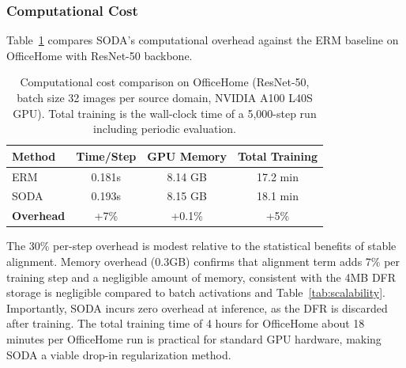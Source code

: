 \documentclass[preprint,12pt]{elsarticle}
\providecommand{\DIFadd}[1]{{\protect\color{blue} \sf #1}} %
\providecommand{\DIFdel}[1]{{\protect\color{red} \scriptsize #1}} %
\providecommand{\DIFaddbegin}{} %
\providecommand{\DIFaddend}{} %
\providecommand{\DIFdelbegin}{} %
\providecommand{\DIFdelend}{} %
\providecommand{\DIFaddFL}[1]{\DIFadd{#1}} %
\providecommand{\DIFdelFL}[1]{\DIFdel{#1}} %
\providecommand{\DIFaddbeginFL}{} %
\providecommand{\DIFaddendFL}{} %
\providecommand{\DIFdelbeginFL}{} %
\providecommand{\DIFdelendFL}{} %
\newcommand{\DIFscaledelfig}{0.5}
\newlength{\DIFdelgraphicswidth} %
\newlength{\DIFdelgraphicsheight} %
\newcommand{\DIFaddincludegraphics}[2][]{{\color{blue}\fbox{\DIFOincludegraphics[#1]{#2}}}} %
\newcommand{\DIFdelincludegraphics}[2][]{%
\sbox{\DIFdelgraphicsbox}{\DIFOincludegraphics[#1]{#2}}%
\settoboxwidth{\DIFdelgraphicswidth}{\DIFdelgraphicsbox} %
\settoboxtotalheight{\DIFdelgraphicsheight}{\DIFdelgraphicsbox} %
\scalebox{\DIFscaledelfig}{%
\parbox[b]{\DIFdelgraphicswidth}{\usebox{\DIFdelgraphicsbox}\\[-\baselineskip] \rule{\DIFdelgraphicswidth}{0em}}\llap{\resizebox{\DIFdelgraphicswidth}{\DIFdelgraphicsheight}{%
\setlength{\unitlength}{\DIFdelgraphicswidth}%
\begin{picture}(1,1)%
\thicklines\linethickness{2pt} %
{\color[rgb]{1,0,0}\put(0,0){\framebox(1,1){}}}%
{\color[rgb]{1,0,0}\put(0,0){\line( 1,1){1}}}%
{\color[rgb]{1,0,0}\put(0,1){\line(1,-1){1}}}%
\end{picture}%
}\hspace*{3pt}}} %
} %
\DeclareRobustCommand{\DIFaddbegin}{\DIFOaddbegin \let\includegraphics\DIFaddincludegraphics} %
\DeclareRobustCommand{\DIFaddend}{\DIFOaddend \let\includegraphics\DIFOincludegraphics} %
\DeclareRobustCommand{\DIFdelbegin}{\DIFOdelbegin \let\includegraphics\DIFdelincludegraphics} %
\DeclareRobustCommand{\DIFdelend}{\DIFOaddend \let\includegraphics\DIFOincludegraphics} %
\DeclareRobustCommand{\DIFaddbeginFL}{\DIFOaddbeginFL \let\includegraphics\DIFaddincludegraphics} %
\DeclareRobustCommand{\DIFaddendFL}{\DIFOaddendFL \let\includegraphics\DIFOincludegraphics} %
\DeclareRobustCommand{\DIFdelbeginFL}{\DIFOdelbeginFL \let\includegraphics\DIFdelincludegraphics} %
\DeclareRobustCommand{\DIFdelendFL}{\DIFOaddendFL \let\includegraphics\DIFOincludegraphics} %
\begin{document}
\subsubsection{Computational Cost}
\label{sssec:computational_cost}

Table~\ref{tab:timing} compares SODA's computational overhead against the ERM baseline on OfficeHome with ResNet-50 backbone.

\begin{table}[t]
\caption{Computational cost comparison on OfficeHome (ResNet-50, \DIFdelbeginFL \DIFdelFL{batch size }\DIFdelendFL 32 \DIFaddbeginFL \DIFaddFL{images per source domain}\DIFaddendFL , NVIDIA \DIFdelbeginFL \DIFdelFL{A100 }\DIFdelendFL \DIFaddbeginFL \DIFaddFL{L40S }\DIFaddendFL GPU). \DIFaddbeginFL \DIFaddFL{Total training is the wall-clock time of a 5,000-step run including periodic evaluation.}\DIFaddendFL }
\label{tab:timing}
\centering
\small
\DIFdelbeginFL %
\DIFdelendFL \DIFaddbeginFL \begin{tabular}{lccc}
\toprule
\textbf{Method} & \textbf{Time/Step} & \textbf{GPU Memory} & \textbf{Total Training} \\
\midrule
ERM & 0.181s & 8.14 GB & 17.2 min \\
SODA & 0.193s & 8.15 GB & 18.1 min \\
\midrule
\textbf{Overhead} & +7\% & +0.1\% & +5\% \\
\bottomrule
\end{tabular}
\DIFaddendFL \end{table}

The \DIFdelbegin \DIFdel{30\% per-step overhead is modest relative to the statistical benefits of stable alignment. Memory overhead (0.3GB) confirms that }\DIFdelend \DIFaddbegin \DIFadd{alignment term adds 7\% per training step and a negligible amount of memory, consistent with }\DIFaddend the 4MB DFR storage \DIFdelbegin \DIFdel{is negligible compared to batch activations}\DIFdelend \DIFaddbegin \DIFadd{and Table~\ref{tab:scalability}}\DIFaddend . Importantly, SODA incurs zero overhead at inference, as the DFR is discarded after training. The total training time of \DIFdelbegin \DIFdel{4 hours for OfficeHome }\DIFdelend \DIFaddbegin \DIFadd{about 18 minutes per OfficeHome run }\DIFaddend is practical for standard GPU hardware, making SODA a viable drop-in regularization method.
\end{document}

